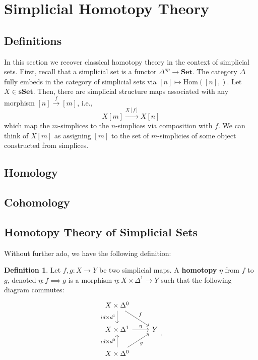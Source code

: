 \documentclass{article}
\theoremstyle{definition}
\newtheorem{defn}{Definition}[section]
\newcommand{\Hom}{\text{Hom}}
\newcommand{\cat}[1]{\mathbf{#1}}
\begin{document}
    \section{Simplicial Homotopy Theory}
    \subsection{Definitions}
    In this section we recover classical homotopy theory in the context of simplicial sets. First, recall that a simplicial set is a functor $\Delta^{op}\rightarrow \cat{Set}$. The category $\Delta$ fully embeds in the category of simplicial sets via $[n]\mapsto \Hom([n], )$. Let $X\in\cat{sSet}$. Then, there are simplicial structure maps associated with any morphism $[n]\xrightarrow{f} [m]$, i.e., 
    \[X[m]\xrightarrow{X[f]} X[n] \] which map the $m$-simplices to the $n$-simplices via composition with $f$. We can think of $X[m]$ as assigning $[m]$ to the set of $m$-simplicies of some object constructed from simplices.
    \subsection{Homology}
    \subsection{Cohomology}
    \subsection{Homotopy Theory of Simplicial Sets}
    Without further ado, we have the following definition:
    \begin{defn}
    Let $f,g:X\rightarrow Y$ be two simplicial maps. A \textbf{homotopy} $\eta$ from $f$ to $g$, denoted $\eta:f\implies g$ is a morphism $\eta:X\times\Delta^{1}\rightarrow Y$ such that the following diagram commutes:
     \[
    \begin{tikzcd}
    X\times\Delta^{0}\arrow[d,"id\times d^{1}"']\arrow[dr,"f"]\\
    X\times\Delta^{1}\arrow[r,"\eta"]	& Y\\
    X\times\Delta^{0}\arrow[u,"id\times d^{0}"]\arrow[ur,"g"']\\
    \end{tikzcd}.
    \]
    \end{defn}
    
\end{document}
